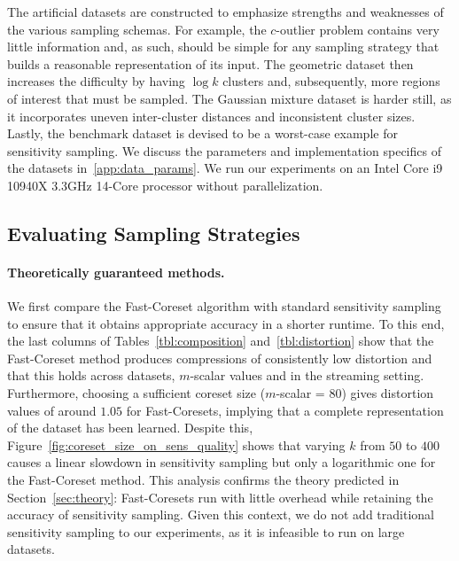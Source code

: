 The artificial datasets are constructed to emphasize strengths and weaknesses of the various sampling schemas. For example, the $c$-outlier problem contains
very little information and, as such, should be simple for any sampling strategy that builds a reasonable representation of its input. The geometric dataset
then increases the difficulty by having $\log k$ clusters and, subsequently, more regions of interest that must be sampled. The Gaussian mixture dataset is
harder still, as it incorporates uneven inter-cluster distances and inconsistent cluster sizes. Lastly, the benchmark dataset is devised to be a worst-case
example for sensitivity sampling. We discuss the parameters and implementation specifics of the datasets in~\cref{app:data_params}.  We run our experiments on
an Intel Core i9 10940X 3.3GHz 14-Core processor without parallelization.

\subsection{Evaluating Sampling Strategies}
\label{ssec:alg_qualities}




\paragraph*{Theoretically guaranteed methods.}

We first compare the Fast-Coreset algorithm with standard sensitivity sampling to ensure that it obtains appropriate accuracy in a shorter runtime.  To this
end, the last columns of Tables~\ref{tbl:composition} and~\ref{tbl:distortion} show that the Fast-Coreset method produces compressions of consistently low
distortion and that this holds across datasets, $m$-scalar values and in the streaming setting. Furthermore, choosing a sufficient coreset size ($m$-scalar
= 80) gives distortion values of around $1.05$ for Fast-Coresets, implying that a complete representation of the dataset has been learned. Despite this,
Figure~\ref{fig:coreset_size_on_sens_quality} shows that varying $k$ from $50$ to $400$ causes a linear slowdown in sensitivity sampling but only a logarithmic
one for the Fast-Coreset method. This analysis confirms the theory predicted in Section~\ref{sec:theory}: Fast-Coresets run with little overhead while retaining
the accuracy of sensitivity sampling.  Given this context, we do not add traditional sensitivity sampling to our experiments, as it is infeasible to run on
large datasets.

